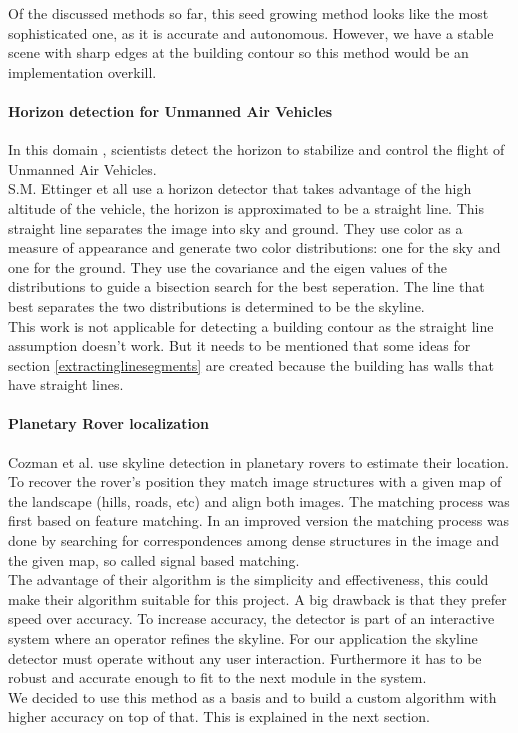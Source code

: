 Of the discussed methods so far, this seed growing method looks like the most sophisticated one, as
it is accurate and autonomous. However, we have a stable scene with sharp edges
at the building contour so this method would be an implementation overkill.  


\paragraph{Horizon detection for Unmanned Air Vehicles}
In this domain \cite{Guidedflight}, scientists detect the horizon to stabilize and control the
flight of Unmanned Air Vehicles.\\  
S.M. Ettinger et all \cite{Guidedflight} use a horizon detector that takes
advantage of the high altitude of the vehicle, the horizon is approximated to be
a straight line.  
This straight line separates the image into sky and ground. They use color as a measure of appearance and generate two color
distributions: one for the sky and one for the ground. They use the covariance and the eigen values of the distributions to guide a bisection search for the best seperation. The line that best separates the two distributions is determined to be the skyline.\\

This work is not applicable for detecting a building contour as the straight
line assumption doesn't work.  But it needs to be mentioned that some ideas
for section \ref{extractinglinesegments} are created because the building has
	walls that have straight lines.

\paragraph{Planetary Rover localization}
Cozman et al. \cite{Rover} use skyline detection in planetary rovers to estimate 
their location.  
To recover the rover's position they match image structures with a given map
of the landscape (hills, roads, etc) and align both images.
The matching process was first based on feature matching. In an improved version the matching process was done by searching for correspondences among dense structures in the image and the given map, so called signal based matching.\\
The advantage of their algorithm is the simplicity and effectiveness, this
could make their algorithm suitable for this project.  A big drawback is that
they prefer speed over accuracy.  To increase accuracy, the detector is part
of an interactive system where an operator refines the skyline.  For our
application the skyline detector must operate without any user interaction.
Furthermore it has to be robust and accurate enough to fit to the next module
in the system.\\
We decided to use this method as a basis and to
build a custom algorithm with higher accuracy on top of that. This is explained
in the next section.


